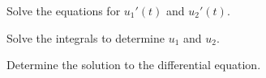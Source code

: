 \begin{problem}
\begin{subproblem}
    \vfill

  \item Solve the equations for $u_1'(t)$ and $u_2'(t)$.

    \vfill

    \clearpage

  \item Solve the integrals to determine $u_1$ and $u_2$.

    \vfill

  \item Determine the solution to the differential equation.

    \vfill


  \end{subproblem}

\end{problem}


